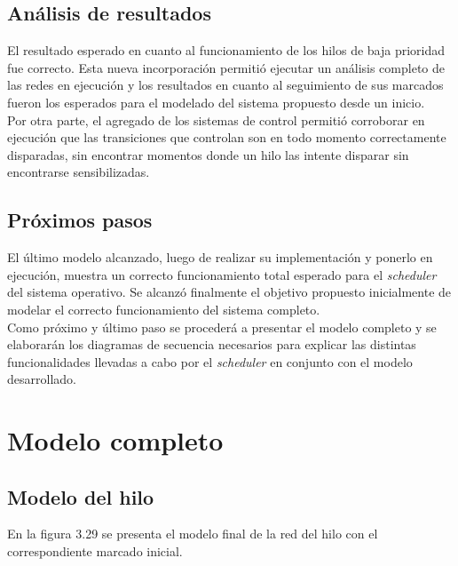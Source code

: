 \documentclass[a4paper]{book}
\begin{document}
\subsection{An\'alisis de resultados}
El resultado esperado en cuanto al funcionamiento de los hilos de baja prioridad fue correcto. Esta nueva incorporaci\'on permiti\'o ejecutar un an\'alisis completo de las redes en ejecuci\'on y los resultados en cuanto al seguimiento de sus marcados fueron los esperados para el modelado del sistema propuesto desde un inicio.\\

Por otra parte, el agregado de los sistemas de control permiti\'o corroborar en ejecuci\'on que las transiciones que controlan son en todo momento correctamente disparadas, sin encontrar momentos donde un hilo las intente disparar sin encontrarse sensibilizadas.

\subsection{Pr\'oximos pasos}
El \'ultimo modelo alcanzado, luego de realizar su implementaci\'on y ponerlo en ejecuci\'on, muestra un correcto funcionamiento total esperado para el \emph{scheduler} del sistema operativo. Se alcanz\'o finalmente el objetivo propuesto inicialmente de modelar el correcto funcionamiento del sistema completo.\\

Como pr\'oximo y \'ultimo paso se proceder\'a a presentar el modelo completo y se elaborar\'an los diagramas de secuencia necesarios para explicar las distintas funcionalidades llevadas a cabo por el \emph{scheduler} en conjunto con el modelo desarrollado.


\newpage
\section{Modelo completo}

\subsection{Modelo del hilo}

En la figura 3.29 se presenta el modelo final de la red del hilo con el correspondiente marcado inicial.
\end{document}
